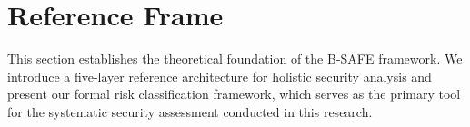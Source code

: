 \section{Reference Frame}
\label{sec:reference_frame}

This section establishes the theoretical foundation of the B-SAFE framework. We introduce a five-layer reference architecture for holistic security analysis and present our formal risk classification framework, which serves as the primary tool for the systematic security assessment conducted in this research.

